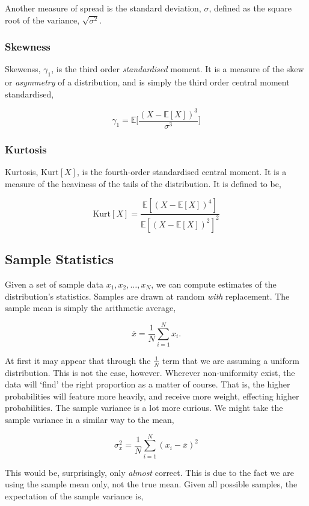 \documentclass[11pt]{amsart}
\begin{document}
Another measure of spread is the standard deviation, $\sigma$, defined as the square root of the variance, $\sqrt{\sigma^2}$.

\subsubsection{Skewness}

Skewenss, $\gamma_1$, is the third order \emph{standardised} moment. It is a measure of the skew or \emph{asymmetry} of a distribution, and is simply the third order central moment standardised,

$$
\gamma_1 = \mathbb{E}\Bigg[\frac{(X - \mathbb{E}[X])^3}{\sigma^3}\Bigg]
$$

\subsubsection{Kurtosis}

Kurtosis, $\text{Kurt}[X]$, is the fourth-order standardised central moment. It is a measure of the heaviness of the tails of the distribution. It is defined to be,

$$
\text{Kurt}[X] = \frac{\mathbb{E}[(X - \mathbb{E}[X])^4]}{\mathbb{E}[(X - \mathbb{E}[X])^2]^2}
$$

\subsection{Sample Statistics}

Given a set of sample data $x_1, x_2, \dots, x_N$, we can compute estimates of the distribution's statistics. Samples are drawn at random \emph{with} replacement. The sample mean is simply the arithmetic average,

$$\bar{x} = \frac{1}{N}\sum_{i=1}^N x_i.$$

At first it may appear that through the $\frac{1}{N}$ term that we are assuming a uniform distribution. This is not the case, however. Wherever non-uniformity exist, the data will `find' the right proportion as a matter of course. That is, the higher probabilities will feature more heavily, and receive more weight, effecting higher probabilities. The sample variance is a lot more curious. We might take the sample variance in a similar way to the mean,

$$\sigma_x^2 = \frac{1}{N}\sum_{i=1}^N (x_i - \bar{x})^2$$

This would be, surprisingly, only \emph{almost} correct. This is due to the fact we are using the sample mean only, not the true mean. Given all possible samples, the expectation of the sample variance is,
\end{document}
